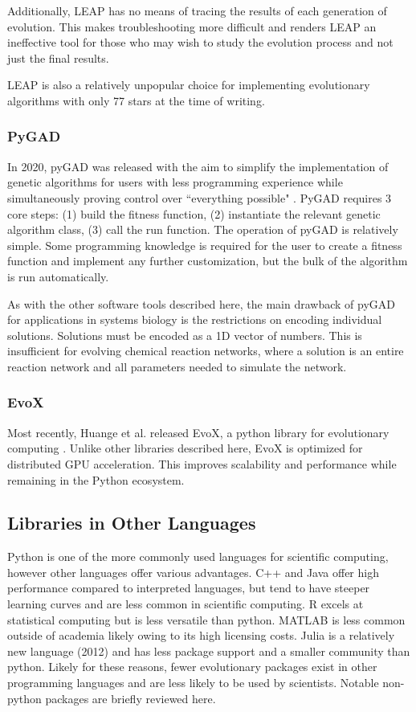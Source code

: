 \documentclass[12pt]{report}
\begin{document}
Additionally, LEAP has no means of tracing the results of each generation of evolution. This makes troubleshooting more difficult and renders LEAP an ineffective tool for those who may wish to study the evolution process and not just the final results.

LEAP is also a relatively unpopular choice for implementing evolutionary algorithms with only 77 stars at the time of writing.

\subsubsection{PyGAD}
In 2020, pyGAD was released with the aim to simplify the implementation of genetic algorithms for users with less programming experience while simultaneously proving control over ``everything possible" \cite{gad2023pygad}. PyGAD requires 3 core steps: (1) build the fitness function, (2) instantiate the relevant genetic algorithm class, (3) call the run function. The operation of pyGAD is relatively simple. Some programming knowledge is required for the user to create a fitness function and implement any further customization, but the bulk of the algorithm is run automatically. 

As with the other software tools described here, the main drawback of pyGAD for applications in systems biology is the restrictions on encoding individual solutions. Solutions must be encoded as a 1D vector of numbers. This is insufficient for evolving chemical reaction networks, where a solution is an entire reaction network and all parameters needed to simulate the network.

\subsubsection{EvoX}
Most recently, Huange et al. released EvoX, a python library for evolutionary computing \cite{Huang2024}. Unlike other libraries described here, EvoX is optimized for distributed GPU acceleration. This improves scalability and performance while remaining in the Python ecosystem.

\subsection{Libraries in Other Languages}
Python is one of the more commonly used languages for scientific computing, however other languages offer various advantages. C++ and Java offer high performance compared to interpreted languages, but tend to have steeper learning curves and are less common in scientific computing. R excels at statistical computing but is less versatile than python. MATLAB is less common outside of academia likely owing to its high licensing costs. Julia is a relatively new language (2012) and has less package support and a smaller community than python. Likely for these reasons, fewer evolutionary packages exist in other programming languages and are less likely to be used by scientists. Notable non-python packages are briefly reviewed here.
\end{document}
